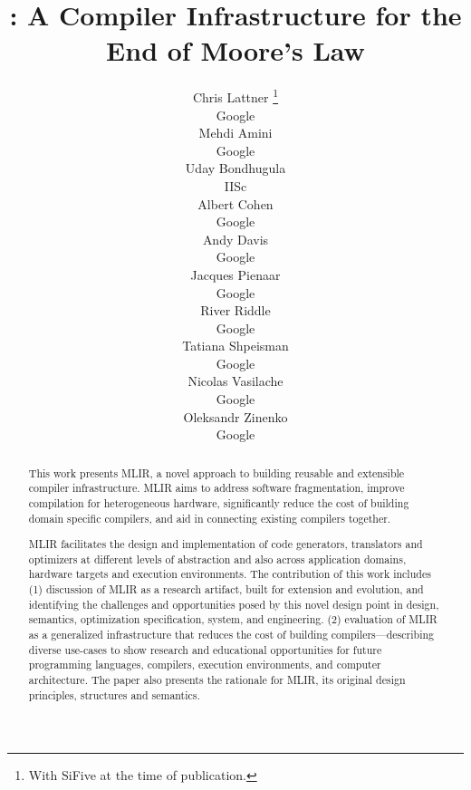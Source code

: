 \documentclass{article}
\title{\MLIR: A Compiler Infrastructure for the End of Moore's Law}
\author{%
  Chris Lattner
  \thanks{With SiFive at the time of publication.} \\
  Google \\
  \And
  Mehdi Amini \\
  Google \\
  \And
  Uday Bondhugula \\
  IISc \\
  \And
  Albert Cohen \\
  Google \\
  \And
  Andy Davis \\
  Google \\
  \And
  Jacques Pienaar \\
  Google \\
  \And
  River Riddle \\
  Google \\
  \And
  Tatiana Shpeisman \\
  Google \\
  \And
  Nicolas Vasilache \\
  Google \\
  \And
  Oleksandr Zinenko \\
  Google \\
}
\newcommand{\maybebreak}{}
\newcommand{\MLIR}{MLIR\xspace}
\begin{document}
\maketitle

\begin{abstract}
  This work presents \MLIR, a novel approach to building reusable and
  extensible compiler infrastructure. \MLIR aims to address software
  fragmentation, improve compilation for heterogeneous hardware,
  significantly reduce the cost of building domain specific compilers,
  and aid in connecting existing compilers together.

  \MLIR facilitates the design and implementation of code generators,
  translators and optimizers at different levels of abstraction and
  also across application domains, hardware targets and execution
  environments. The contribution of this work includes (1) discussion
  of \MLIR as a research artifact, built for extension and evolution,
  and identifying the challenges and opportunities posed by this novel
  design point in design, semantics, optimization specification,
  system, and engineering. (2) evaluation of \MLIR as a generalized
  infrastructure that reduces the cost of building
  compilers---describing diverse use-cases to show research and
  educational opportunities for future programming languages,
  compilers, execution environments, and computer architecture. The
  paper also presents the rationale for \MLIR, its original design
  principles, structures and semantics.
\end{abstract}


\maybebreak

\maybebreak

\maybebreak

\maybebreak

\maybebreak

\maybebreak

\maybebreak



%


\end{document}
